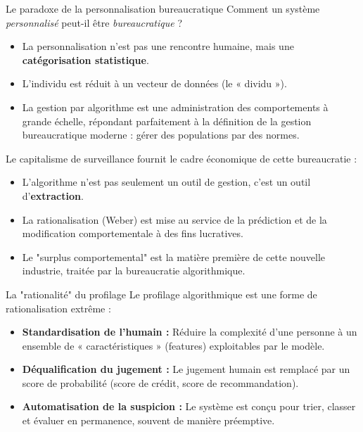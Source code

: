 \documentclass[9pt, aspectratio=169]{beamer}
\begin{document}
\begin{frame}{Le paradoxe de la personnalisation bureaucratique}
    Comment un système \textit{personnalisé} peut-il être \textit{bureaucratique} ?
    \begin{itemize}
        \item La personnalisation n'est pas une rencontre humaine, mais une \textbf{catégorisation statistique}.
        \item L'individu est réduit à un vecteur de données (le « dividu »).
        \item La gestion par algorithme est une administration des comportements à grande échelle, répondant parfaitement à la définition de la gestion bureaucratique moderne : gérer des populations par des normes.
    \end{itemize}
\end{frame}

\begin{frame}{Le capitalisme de surveillance}
    \cite{Zuboff2023The} fournit le cadre économique de cette bureaucratie :
    \begin{itemize}
        \item L'algorithme n'est pas seulement un outil de gestion, c'est un outil d'\textbf{extraction}.
        \item La rationalisation (Weber) est mise au service de la prédiction et de la modification comportementale à des fins lucratives.
        \item Le "surplus comportemental" est la matière première de cette nouvelle industrie, traitée par la bureaucratie algorithmique.
    \end{itemize}
\end{frame}

\begin{frame}{La "rationalité" du profilage}
    Le profilage algorithmique est une forme de rationalisation extrême :
    \begin{itemize}
        \item \textbf{Standardisation de l'humain :} Réduire la complexité d'une personne à un ensemble de « caractéristiques » (features) exploitables par le modèle.
        \item \textbf{Déqualification du jugement :} Le jugement humain est remplacé par un score de probabilité (score de crédit, score de recommandation).
        \item \textbf{Automatisation de la suspicion :} Le système est conçu pour trier, classer et évaluer en permanence, souvent de manière préemptive.
    \end{itemize}
\end{frame}
\end{document}
